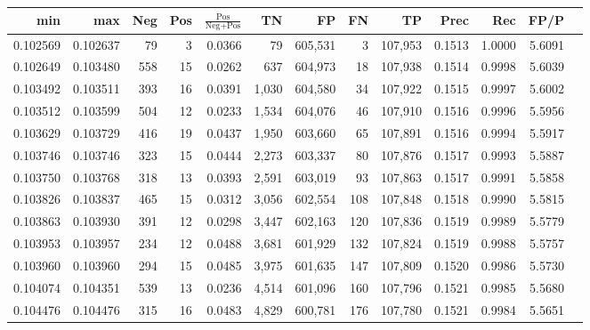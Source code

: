 \begin{tabular}{rrrrrrrrrrrrr}
\toprule
     min &      max &   Neg & Pos & $\frac{\text{Pos}}{\text{Neg}+\text{Pos}}$ &      TN &      FP &      FN &      TP &   Prec &    Rec &   FP/P \\
\midrule
0.102569 & 0.102637 &    79 &   3 &                                     0.0366 &      79 & 605,531 &       3 & 107,953 & 0.1513 & 1.0000 & 5.6091 \\
0.102649 & 0.103480 &   558 &  15 &                                     0.0262 &     637 & 604,973 &      18 & 107,938 & 0.1514 & 0.9998 & 5.6039 \\
0.103492 & 0.103511 &   393 &  16 &                                     0.0391 &   1,030 & 604,580 &      34 & 107,922 & 0.1515 & 0.9997 & 5.6002 \\
0.103512 & 0.103599 &   504 &  12 &                                     0.0233 &   1,534 & 604,076 &      46 & 107,910 & 0.1516 & 0.9996 & 5.5956 \\
0.103629 & 0.103729 &   416 &  19 &                                     0.0437 &   1,950 & 603,660 &      65 & 107,891 & 0.1516 & 0.9994 & 5.5917 \\
0.103746 & 0.103746 &   323 &  15 &                                     0.0444 &   2,273 & 603,337 &      80 & 107,876 & 0.1517 & 0.9993 & 5.5887 \\
0.103750 & 0.103768 &   318 &  13 &                                     0.0393 &   2,591 & 603,019 &      93 & 107,863 & 0.1517 & 0.9991 & 5.5858 \\
0.103826 & 0.103837 &   465 &  15 &                                     0.0312 &   3,056 & 602,554 &     108 & 107,848 & 0.1518 & 0.9990 & 5.5815 \\
0.103863 & 0.103930 &   391 &  12 &                                     0.0298 &   3,447 & 602,163 &     120 & 107,836 & 0.1519 & 0.9989 & 5.5779 \\
0.103953 & 0.103957 &   234 &  12 &                                     0.0488 &   3,681 & 601,929 &     132 & 107,824 & 0.1519 & 0.9988 & 5.5757 \\
0.103960 & 0.103960 &   294 &  15 &                                     0.0485 &   3,975 & 601,635 &     147 & 107,809 & 0.1520 & 0.9986 & 5.5730 \\
0.104074 & 0.104351 &   539 &  13 &                                     0.0236 &   4,514 & 601,096 &     160 & 107,796 & 0.1521 & 0.9985 & 5.5680 \\
0.104476 & 0.104476 &   315 &  16 &                                     0.0483 &   4,829 & 600,781 &     176 & 107,780 & 0.1521 & 0.9984 & 5.5651 \\

\end{tabular}
